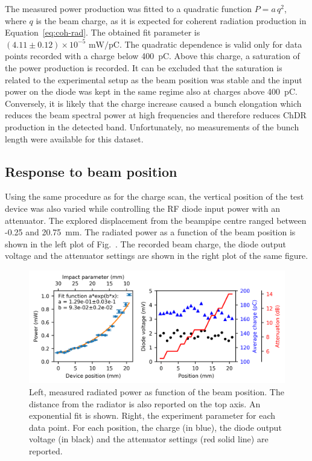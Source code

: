 The measured power production was fitted to a quadratic function ${P = a \, q^2}$, where $q$ is the beam charge, as it is expected for coherent radiation production in Equation~\ref{eq:coh-rad}. The obtained fit parameter is ${(4.11\pm0.12)\times10^{-5} \text{ mW/pC}}$. The quadratic dependence is valid only for data points recorded with a charge below 400~pC. Above this charge, a saturation of the power production is recorded. It can be excluded that the saturation is related to the experimental setup as the beam position was stable and the input power on the diode was kept in the same regime also at charges above 400~pC. Conversely, it is likely that the charge increase caused a bunch elongation \cite{Thibaut_pc} which reduces the beam spectral power at high frequencies and therefore reduces ChDR production in the detected band. Unfortunately, no measurements of the bunch length were available for this dataset. 





\subsection{Response to beam position}

Using the same procedure as for the charge scan, the vertical position of the test device was also varied while controlling the RF diode input power with an attenuator. The explored displacement from the beampipe centre ranged between -0.25 and 20.75~mm. The radiated power as a function of the beam position is shown in the left plot of Fig.~. The recorded beam charge, the diode output voltage and the attenuator settings are shown in the right plot of the same figure. 



\begin{figure}[!b]
\centering
\includegraphics[scale=1, keepaspectratio]{pictures/Position_scan}
\caption{Left, measured radiated power as function of the beam position. The distance from the radiator is also reported on the top axis. An exponential fit is shown. Right, the experiment parameter for each data point. For each position, the charge (in blue), the diode output voltage (in black) and the attenuator settings (red solid line) are reported.}
\label{fig:position_scan_single_wg}
\end{figure}

